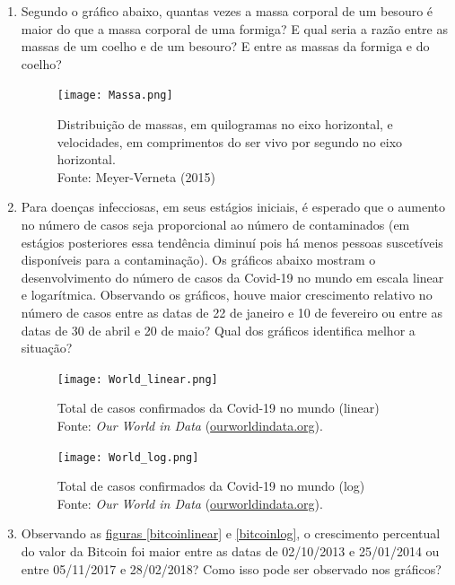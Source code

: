 \begin{enumerate}

\item \label{Exer1} Segundo o gráfico abaixo, quantas vezes a massa corporal de um besouro é maior do que a massa corporal de uma formiga? E qual seria a razão entre as massas de um coelho e de um besouro? E entre as massas da formiga e do coelho?

\begin{figure}[H]
\centering

\texttt{[image: Massa.png]}
\caption{{Distribuição de massas, em quilogramas no eixo horizontal, e velocidades, em comprimentos do ser vivo por segundo no eixo horizontal.} \\ Fonte: Meyer-Verneta (2015)
}
\end{figure}


\item \label{Exer2} Para doenças infecciosas, em seus estágios iniciais, é esperado que o aumento no número de casos seja proporcional ao número de contaminados (em estágios posteriores essa tendência diminuí pois há menos pessoas suscetíveis disponíveis para a contaminação). Os gráficos abaixo mostram o desenvolvimento  do número de casos da Covid-19 no mundo em escala linear e logarítmica. Observando os gráficos, houve maior crescimento relativo no número de casos entre as datas de 22 de janeiro e 10 de fevereiro ou entre as datas de 30 de abril e 20 de maio? Qual dos gráficos identifica melhor a situação?

\begin{figure}[H]
\centering

\texttt{[image: World\_linear.png]}
\caption{Total de casos confirmados da Covid-19 no mundo (linear)\\
Fonte: \textit{Our World in Data} (\url{ourworldindata.org}).}
\end{figure}

\begin{figure}[H]
\centering

\texttt{[image: World\_log.png]}
\caption{Total de casos confirmados da Covid-19 no mundo (log)\\
Fonte: \textit{Our World in Data} (\url{ourworldindata.org}).}
\end{figure}


\item \label{Exer3} Observando as \hyperref[bitcoinlinear]{figuras \ref{bitcoinlinear}} e \ref{bitcoinlog}, o crescimento percentual do valor da Bitcoin foi maior entre as datas de 02/10/2013 e 25/01/2014 ou entre 05/11/2017 e 28/02/2018? Como isso pode ser observado nos gráficos?



\end{enumerate}
